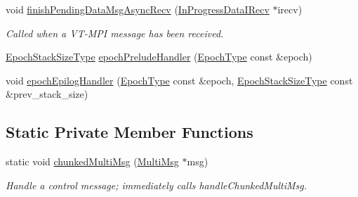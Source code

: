 \begin{DoxyCompactItemize}
void \hyperlink{structvt_1_1messaging_1_1_active_messenger_a80a13017308870133ff8538741bee394}{finish\+Pending\+Data\+Msg\+Async\+Recv} (\hyperlink{structvt_1_1messaging_1_1_in_progress_data_i_recv}{In\+Progress\+Data\+I\+Recv} $\ast$irecv)
\begin{DoxyCompactList}\small\item\em Called when a V\+T-\/\+M\+PI message has been received. \end{DoxyCompactList}\item 
\hyperlink{structvt_1_1messaging_1_1_active_messenger_a447c6c0b3387142fd14b26c12e3ed877}{Epoch\+Stack\+Size\+Type} \hyperlink{structvt_1_1messaging_1_1_active_messenger_a8209c23bddf111089f4fd64d7cd2f67e}{epoch\+Prelude\+Handler} (\hyperlink{namespacevt_a985a5adf291c34a3ca263b3378388236}{Epoch\+Type} const \&epoch)
\item 
void \hyperlink{structvt_1_1messaging_1_1_active_messenger_a6418078d6eba01bfd36e46d54c076713}{epoch\+Epilog\+Handler} (\hyperlink{namespacevt_a985a5adf291c34a3ca263b3378388236}{Epoch\+Type} const \&epoch, \hyperlink{structvt_1_1messaging_1_1_active_messenger_a447c6c0b3387142fd14b26c12e3ed877}{Epoch\+Stack\+Size\+Type} const \&prev\+\_\+stack\+\_\+size)
\end{DoxyCompactItemize}
\subsection*{Static Private Member Functions}
\begin{DoxyCompactItemize}
\item 
static void \hyperlink{structvt_1_1messaging_1_1_active_messenger_ae8f6417a532c73601f9c26190a29a21e}{chunked\+Multi\+Msg} (\hyperlink{structvt_1_1messaging_1_1_multi_msg}{Multi\+Msg} $\ast$msg)
\begin{DoxyCompactList}\small\item\em Handle a control message; immediately calls {\ttfamily handle\+Chunked\+Multi\+Msg}. \end{DoxyCompactList}\end{DoxyCompactItemize}
